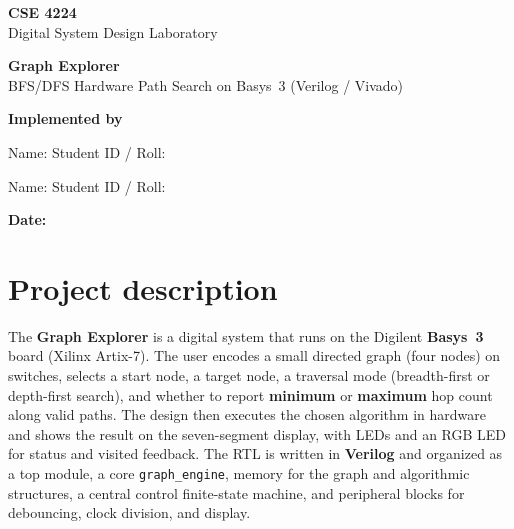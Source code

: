 \documentclass[11pt,a4paper]{article}
\begin{document}
\begin{titlepage}
  \centering
  \vspace*{1.8cm}

  {\Large\bfseries CSE 4224}\\[0.35em]
  {\large Digital System Design Laboratory}

  \vspace{2.2cm}

  {\LARGE\bfseries Graph Explorer}\\[0.5em]
  {\Large BFS/DFS Hardware Path Search on Basys~3 (Verilog / Vivado)}

  \vfill

  \textbf{Implemented by}

  \vspace{1.1cm}

  \begin{minipage}{0.88\textwidth}
    \centering
    Name: \hrulefill \quad Student ID / Roll: \hrulefill

    \vspace{1.0cm}

    Name: \hrulefill \quad Student ID / Roll: \hrulefill
  \end{minipage}

  \vspace{1.8cm}

  \textbf{Date:} \hrulefill

  \vspace{2cm}
\end{titlepage}

\newpage
\setcounter{page}{1}

\section{Project description}

The \textbf{Graph Explorer} is a digital system that runs on the Digilent \textbf{Basys~3} board (Xilinx Artix-7). The user encodes a small directed graph (four nodes) on switches, selects a start node, a target node, a traversal mode (breadth-first or depth-first search), and whether to report \textbf{minimum} or \textbf{maximum} hop count along valid paths. The design then executes the chosen algorithm in hardware and shows the result on the seven-segment display, with LEDs and an RGB LED for status and visited feedback. The RTL is written in \textbf{Verilog} and organized as a top module, a core \texttt{graph\_engine}, memory for the graph and algorithmic structures, a central control finite-state machine, and peripheral blocks for debouncing, clock division, and display.
\end{document}
